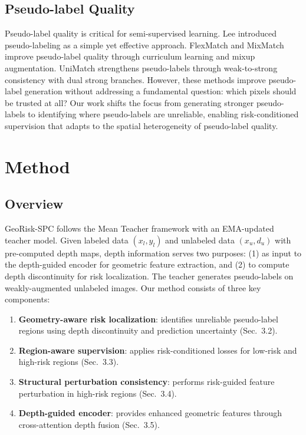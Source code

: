 \documentclass[conference]{IEEEtran}
\begin{document}
\subsection{Pseudo-label Quality}
Pseudo-label quality is critical for semi-supervised learning. Lee \cite{lee2013pseudo} introduced pseudo-labeling as a simple yet effective approach. FlexMatch \cite{zhang2021flexmatch} and MixMatch \cite{berthelot2019mixmatch} improve pseudo-label quality through curriculum learning and mixup augmentation. UniMatch \cite{yang2023unimatch} strengthens pseudo-labels through weak-to-strong consistency with dual strong branches. However, these methods improve pseudo-label generation without addressing a fundamental question: which pixels should be trusted at all? Our work shifts the focus from generating stronger pseudo-labels to identifying where pseudo-labels are unreliable, enabling risk-conditioned supervision that adapts to the spatial heterogeneity of pseudo-label quality.

\section{Method}

\subsection{Overview}
GeoRisk-SPC follows the Mean Teacher \cite{tarvainen2017mean} framework with an EMA-updated teacher model. Given labeled data $(x_l, y_l)$ and unlabeled data $(x_u, d_u)$ with pre-computed depth maps, depth information serves two purposes: (1) as input to the depth-guided encoder for geometric feature extraction, and (2) to compute depth discontinuity for risk localization. The teacher generates pseudo-labels on weakly-augmented unlabeled images. Our method consists of three key components:
\begin{enumerate}
\item \textbf{Geometry-aware risk localization}: identifies unreliable pseudo-label regions using depth discontinuity and prediction uncertainty (Sec.~3.2).
\item \textbf{Region-aware supervision}: applies risk-conditioned losses for low-risk and high-risk regions (Sec.~3.3).
\item \textbf{Structural perturbation consistency}: performs risk-guided feature perturbation in high-risk regions (Sec.~3.4).
\item \textbf{Depth-guided encoder}: provides enhanced geometric features through cross-attention depth fusion (Sec.~3.5).
\end{enumerate}
\end{document}
